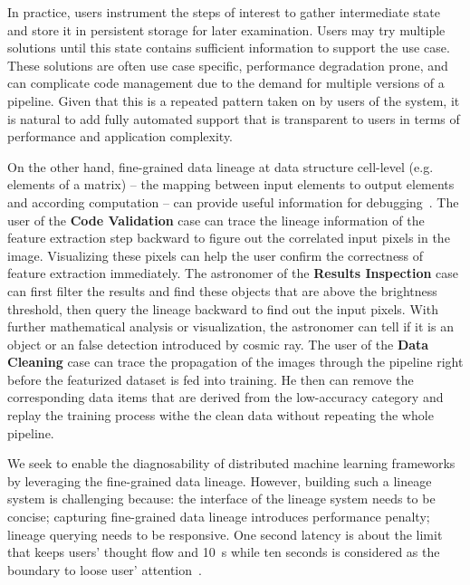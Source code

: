 \documentclass{sig-alternate}
\begin{document}
In practice, users instrument the steps of interest to gather intermediate state and store it in persistent storage
for later examination. Users may try multiple solutions until this state contains sufficient information to support the
use case. These solutions are often use case specific, performance degradation prone, and can complicate code
management due to the demand for multiple versions of a pipeline.
Given that this is a repeated pattern taken on by users of the system, it is natural to add fully automated support 
that is transparent to users in terms of performance and application complexity.

On the other hand, fine-grained data lineage at data structure cell-level (e.g. elements of a matrix) -- the mapping between
input elements to output elements and according computation -- can provide useful information for
debugging~\cite{widom04}. The user of the {\bf Code Validation} case can trace the lineage
information of the feature extraction step backward to figure out the correlated input pixels in the image. Visualizing
these pixels can help the user confirm the correctness of feature extraction immediately. 
The astronomer of the {\bf Results Inspection}
case can first filter the results and find these objects that are above the brightness threshold, then query the lineage
backward to find out the input pixels. With further mathematical analysis or visualization, the astronomer can tell
if it is an object or an false detection introduced by cosmic ray. 
The user of the {\bf Data Cleaning} case can trace the propagation of the images through the pipeline right before
the featurized dataset is fed into training. He then can remove the corresponding data items that are derived from
the low-accuracy category and replay the training process withe the clean data without repeating the whole pipeline.

We seek to enable the diagnosability of distributed machine learning frameworks by leveraging the fine-grained data lineage.
However, building such a lineage system is challenging because: 
the interface of the lineage system needs to be concise;
capturing fine-grained data lineage introduces performance penalty;
lineage querying needs to be responsive.
One second latency is about the limit that keeps users' thought flow and 10~s 
while ten seconds is considered as the boundary to loose user' attention~\cite{nielsen2009}.
\end{document}
